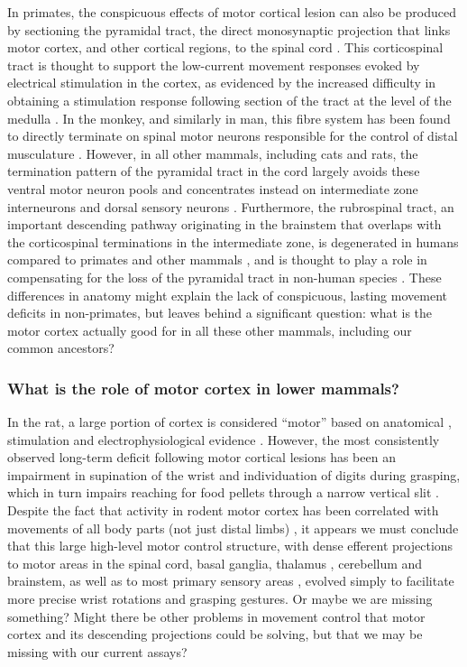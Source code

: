 In primates, the conspicuous effects of motor cortical lesion can also be produced by sectioning the pyramidal tract, the direct monosynaptic projection that links motor cortex, and other cortical regions, to the spinal cord \cite{Tower1940,Lawrence1968}. This corticospinal tract is thought to support the low-current movement responses evoked by electrical stimulation in the cortex, as evidenced by the increased difficulty in obtaining a stimulation response following section of the tract at the level of the medulla \cite{Woolsey1972}. In the monkey, and similarly in man, this fibre system has been found to directly terminate on spinal motor neurons responsible for the control of distal musculature \cite{Leyton1917,Bernhard1954}. However, in all other mammals, including cats and rats, the termination pattern of the pyramidal tract in the cord largely avoids these ventral motor neuron pools and concentrates instead on intermediate zone interneurons and dorsal sensory neurons \cite{Kuypers1981,Yang2003}. Furthermore, the rubrospinal tract, an important descending pathway originating in the brainstem that overlaps with the corticospinal terminations in the intermediate zone, is degenerated in humans compared to primates and other mammals \cite{Square1982}, and is thought to play a role in compensating for the loss of the pyramidal tract in non-human species \cite{Lawrence1968a,Zaaimi2012}. These differences in anatomy might explain the lack of conspicuous, lasting movement deficits in non-primates, but leaves behind a significant question: what is the motor cortex actually good for in all these other mammals, including our common ancestors?

\subsubsection*{What is the role of motor cortex in lower mammals?}

In the rat, a large portion of cortex is considered ``motor'' based on anatomical \cite{Donoghue1982}, stimulation \cite{Donoghue1982,Neafsey1986} and electrophysiological evidence \cite{Hyland1998}. However, the most consistently observed long-term deficit following motor cortical lesions has been an impairment in supination of the wrist and individuation of digits during grasping, which in turn impairs reaching for food pellets through a narrow vertical slit \cite{Alaverdashvili2008a}. Despite the fact that activity in rodent motor cortex has been correlated with movements of all body parts (not just distal limbs) \cite{Hill2011,Erlich2011}, it appears we must conclude that this large high-level motor control structure, with dense efferent projections to motor areas in the spinal cord, basal ganglia, thalamus \cite{Lee2008}, cerebellum and brainstem, as well as to most primary sensory areas \cite{Petreanu2012,Schneider2014}, evolved simply to facilitate more precise wrist rotations and grasping gestures. Or maybe we are missing something? Might there be other problems in movement control that motor cortex and its descending projections could be solving, but that we may be missing with our current assays?

